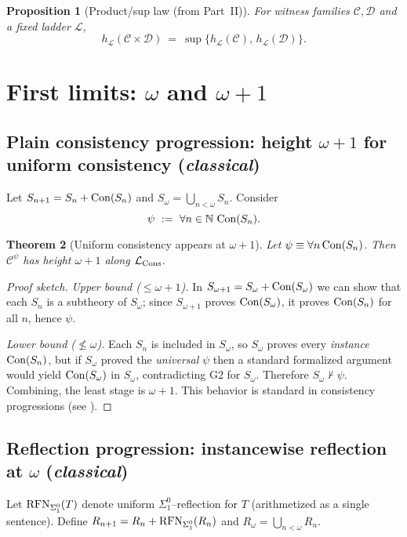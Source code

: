 \documentclass[11pt]{article}
\newtheorem{theorem}{Theorem}[section]
\newtheorem{proposition}[theorem]{Proposition}
\theoremstyle{definition}
\theoremstyle{remark}
\begin{document}
\begin{proposition}[Product/sup law (from Part~II)]
For witness families $\mathcal C,\mathcal D$ and a fixed ladder $\mathcal L$,
\[
h_{\mathcal L}(\mathcal C\times \mathcal D)\ =\ \sup\bigl\{h_{\mathcal L}(\mathcal C),\,h_{\mathcal L}(\mathcal D)\bigr\}.
\]
\end{proposition}

\section{First limits: \texorpdfstring{$\omega$}{ω} and \texorpdfstring{$\omega{+}1$}{ω+1}}

\subsection{Plain consistency progression: height \texorpdfstring{$\omega{+}1$}{ω+1} for uniform consistency (\emph{classical})}
Let $S_{n+1}=S_n+\mathrm{Con}(S_n)$ and $S_\omega=\bigcup_{n<\omega} S_n$. Consider
\[
\psi\ :=\ \forall n\in \mathbb N\ \Con(S_n).
\]

\begin{theorem}[Uniform consistency appears at $\omega{+}1$]\label{IV:thm:omega-plus-one}
Let $\psi \equiv \forall n\,\mathrm{Con}(S_n)$. Then $\mathcal C^\psi$ has height $\omega+1$ along $\mathcal{L}_{\mathrm{Cons}}$.
\end{theorem}

\begin{proof}[Proof sketch]
\emph{Upper bound ($\le \omega{+}1$).} In $S_{\omega+1}=S_\omega+\mathrm{Con}(S_\omega)$ we can show that
each $S_n$ is a subtheory of $S_\omega$; since $S_{\omega+1}$ proves $\mathrm{Con}(S_\omega)$, it proves
$\mathrm{Con}(S_n)$ for all $n$, hence $\psi$.

\emph{Lower bound ($\not\le \omega$).} Each $S_n$ is included in $S_\omega$, so $S_\omega$ proves
every \emph{instance} $\mathrm{Con}(S_n)$, but if $S_\omega$ proved the \emph{universal} $\psi$ then a standard
formalized argument would yield $\mathrm{Con}(S_\omega)$ in $S_\omega$, contradicting G2 for $S_\omega$.
Therefore $S_\omega\nvdash\psi$. Combining, the least stage is $\omega+1$.
This behavior is standard in consistency progressions (see \cite{Feferman1962,HajekPudlak}).
\end{proof}

\subsection{Reflection progression: instancewise reflection at \texorpdfstring{$\omega$}{ω} (\emph{classical})}
Let $\mathrm{RFN}_{\Sigma^0_1}(T)$ denote uniform $\Sigma^0_1$--reflection for $T$ (arithmetized as a single sentence).
Define $R_{n+1}=R_n+\mathrm{RFN}_{\Sigma^0_1}(R_n)$ and $R_\omega=\bigcup_{n<\omega}R_n$.
\end{document}
